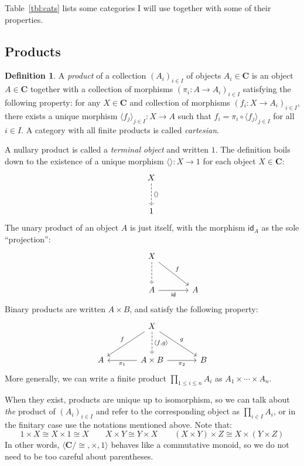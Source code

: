 \documentclass[11pt,oneside]{book}
\theoremstyle{definition}
\newtheorem{definition}[theorem]{Definition}
\newcommand{\kw}[1]{\ensuremath{ \mathsf{#1} }}
\begin{document}
Table~\ref{tbl:cats} lists some categories I will use
together with some of their properties.


\subsection{Products} \label{sec:ct:prod} %

\begin{definition} \label{def:prod}
A \emph{product} of a collection $(A_i)_{i \in I}$
of objects $A_i \in \mathbf{C}$
is an object $A \in \mathbf{C}$
together with a collection of morphisms
$(\pi_i : A \rightarrow A_i)_{i \in I}$
satisfying the following property:
for any $X \in \mathbf{C}$ and collection of morphisms
$(f_i : X \rightarrow A_i)_{i \in I}$,
there exists a unique morphism
$\langle f_j \rangle_{j \in I} : X \rightarrow A$
such that
$f_i = \pi_i \circ \langle f_j \rangle_{j \in I}$
for all $i \in I$.
A category with all finite products is called \emph{cartesian}.
\end{definition}

A nullary product is called a \emph{terminal object} and written $1$.
The definition boils down to the existence of
a unique morphism $\langle \rangle : X \rightarrow 1$
for each object $X \in \mathbf{C}$:
\[
  \begin{tikzcd}[sep=large]
    X \ar[d, dashed, "\langle \rangle"] \\ 1
  \end{tikzcd}
\]
The unary product of an object $A$ is just itself,
with the morphism $\kw{id}_A$ as the sole ``projection'':
\[
  \begin{tikzcd}[sep=large]
    \hspace{0.7em}
    & X \ar[d, dashed] \ar[dr, "f"] & \\
    & A \ar[r, "\kw{id}"'] & A
  \end{tikzcd}
\]
Binary products are written $A \times B$,
and satisfy the following property:
\[
  \begin{tikzcd}[sep=large]
    &
    X \ar[dl, "f"'] \ar[dr, "g"]
      \ar[d, dashed, "{\langle f, g \rangle}"] &
    \\
    A &
    A \times B \ar[l, "\pi_1"] \ar[r, "\pi_2"'] &
    B
  \end{tikzcd}
\]
More generally,
we can write a finite product $\prod_{1 \le i \le n} A_i$
as $A_1 \times \cdots \times A_n$.

When they exist, products are unique up to isomorphism,
so we can talk about \emph{the} product of $(A_i)_{i \in I}$ and
refer to the corresponding object as
$
  \prod_{i \in I} A_i
$,
or in the finitary case use the notations
mentioned above.
Note that:
\[
  1 \times X \cong X \times 1 \cong X
  \qquad
  X \times Y \cong Y \times X
  \qquad
  (X \times Y) \times Z \cong X \times (Y \times Z)
\]
In other words,
$\langle \mathbf{C} / {\cong}, {\times}, 1 \rangle$
behaves like a commutative monoid,
so we do not need to be too careful about parentheses.
\end{document}
